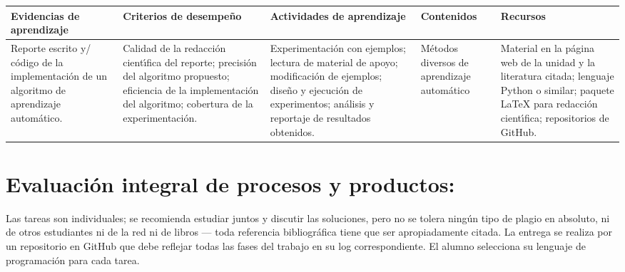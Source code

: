 \documentclass[10 pt]{article}
\begin{document}
\begin{tabular}{|p{28mm}|p{30mm}|p{30mm}|p{30mm}|p{30mm}|}
  \hline
  Evidencias de aprendizaje 
  & Criterios de desempe\~{n}o
  & Actividades de aprendizaje
  & Contenidos
  & Recursos \\ \hline

  Reporte escrito y/ c\'{o}digo de la implementaci\'{o}n de un algoritmo de
  aprendizaje autom\'{a}tico.
  & Calidad de la redacci\'{o}n cient\'{\i}fica del reporte; 
    precisi\'{o}n del algoritmo propuesto;
    eficiencia de la implementaci\'{o}n del algoritmo;
    cobertura de la experimentaci\'{o}n.
  & Experimentaci\'{o}n con ejemplos; lectura de material de apoyo;
    modificaci\'{o}n de ejemplos; dise\~{n}o y ejecuci\'{o}n de experimentos;
    an\'{a}lisis y reportaje de resultados obtenidos.
  &
    M\'{e}todos diversos de aprendizaje autom\'{a}tico
  & Material en la p\'{a}gina web de la unidad y la literatura citada;
    lenguaje Python o similar; paquete {\LaTeX} para redacci\'{o}n cient\'{\i}fica;
    repositorios de GitHub. \\ \hline
  
  \end{tabular}

\newpage
  
  \section{Evaluaci\'{o}n integral de procesos y productos:}
  
  Las tareas son individuales; se recomienda estudiar juntos y
  discutir las soluciones, pero no se tolera ning\'{u}n tipo de plagio en
  absoluto, ni de otros estudiantes ni de la red ni de libros --- toda
  referencia bibliogr\'{a}fica tiene que ser apropiadamente citada. La
  entrega se realiza por un repositorio en GitHub que debe reflejar
  todas las fases del trabajo en su log correspondiente. El alumno
  selecciona su lenguaje de programaci\'{o}n para cada tarea.
\end{document}
